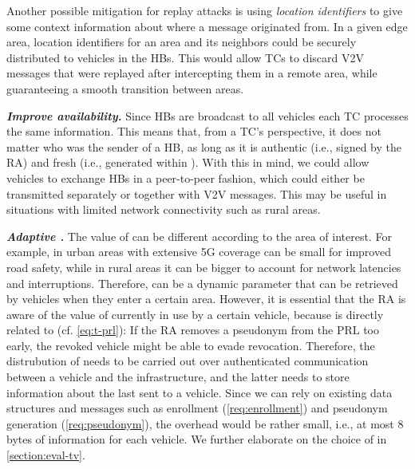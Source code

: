 Another possible mitigation for replay attacks is using \emph{location
identifiers} to give some context information about where a message originated
from. In a given edge area, location identifiers for an area and its neighbors
could be securely distributed to vehicles in the \acp{HB}. This would allow
\acp{TC} to discard \ac{V2V} messages that were replayed after intercepting them
in a remote area, while guaranteeing a smooth transition between areas.

\noindent\textbf{\emph{Improve availability.}}
%
Since \acp{HB} are broadcast to all vehicles each \ac{TC} processes the same
information. This means that, from a \ac{TC}'s perspective, it does not matter
who was the sender of a \ac{HB}, as long as it is authentic (i.e., signed by the
\ac{RA}) and fresh (i.e., generated within \paramtt{}). With this in mind, we
could allow vehicles to exchange \acp{HB} in a peer-to-peer fashion, which could
either be transmitted separately or together with \ac{V2V} messages. This may be
useful in situations with limited network connectivity such as rural areas. 

\noindent\textbf{\emph{Adaptive \paramtt.}}
%
The value of \paramtt{} can be different according to the area of interest. For
example, in urban areas with extensive 5G coverage \paramtt{} can be small for
improved road safety, while in rural areas it can be bigger to account for
network latencies and interruptions. Therefore, \paramtt{} can be a dynamic
parameter that can be retrieved by vehicles when they enter a certain area.
However, it is essential that the \ac{RA} is aware of the value of \paramtt{}
currently in use by a certain vehicle, because \paramtprl{} is directly related
to \paramtt{} (cf. \cref{eq:t-prl}): If the \ac{RA} removes a pseudonym from the
\ac{PRL} too early, the revoked vehicle might be able to evade revocation.
Therefore, the distrubution of \paramtt{} needs to be carried out over
authenticated communication between a vehicle and the infrastructure, and the
latter needs to store information about the last \paramtt{} sent to a vehicle.
Since we can rely on existing data structures and messages such as enrollment
(\cref{req:enrollment}) and pseudonym generation (\cref{req:pseudonym}), the
overhead would be rather small, i.e., at most 8 bytes of information for each
vehicle. We further elaborate on the choice of \paramtt{} in
\cref{section:eval-tv}.

\fi
